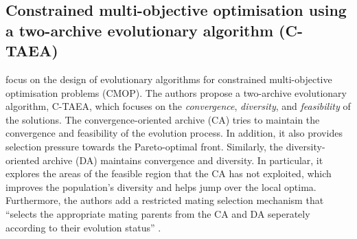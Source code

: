 \documentclass[mscthesis, 11pt]{usiinfthesis}
\theoremstyle{newdefinition}
\begin{document}
\subsection{Constrained multi-objective optimisation using a two-archive evolutionary algorithm (C-TAEA)}\label{sec:ctaea}
\cite{li_two-archive_2019} focus on the design of evolutionary algorithms for constrained multi-objective optimisation problems (CMOP). The authors propose a two-archive evolutionary algorithm, C-TAEA, which focuses on the \emph{convergence}, \emph{diversity}, and \emph{feasibility} of the solutions. The convergence-oriented archive (CA) tries to maintain the convergence and feasibility of the evolution process. In addition, it also provides selection pressure towards the Pareto-optimal front. Similarly, the diversity-oriented archive (DA) maintains convergence and diversity. In particular, it explores the areas of the feasible region that the CA has not exploited, which improves the population's diversity and helps jump over the local optima. Furthermore, the authors add a restricted mating selection mechanism that ``selects the appropriate mating parents from the CA and DA seperately according to their evolution status'' \cite[~p.~304]{li_two-archive_2019}.
\end{document}
